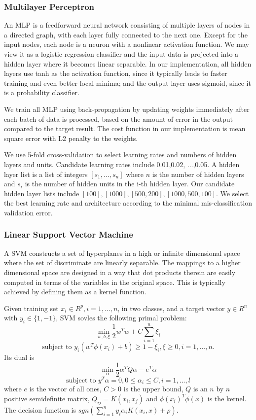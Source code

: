 \documentclass{acm_proc_article-sp}
\begin{document}
\subsubsection{Multilayer Perceptron}
An MLP is a feedforward neural network consisting of multiple layers of nodes in a directed graph, with each layer fully connected to the next one. Except for the input nodes, each node is a neuron with a nonlinear activation function. We may view it as a logistic regression classifier and the input data is projected into a hidden layer where it becomes linear separable. In our implementation, all hidden layers use tanh as the activation function, since it typically leads to faster training and even better local minima; and the output layer uses sigmoid, since it is a probability classifier.

We train all MLP using back-propagation by updating weights immediately after each batch of data is processed, based on the amount of error in the output compared to the target result. The cost function in our implementation is mean square error with L2 penalty to the weights.

We use 5-fold cross-validation to select learning rates and numbers of hidden layers and units. Candidate learning rates include 0.01,0.02, ...,0.05. A hidden layer list is a list of integers $[s_1,...,s_n]$ where $n$ is the number of hidden layers and $s_i$ is the number of hidden units in the i-th hidden layer. Our candidate hidden layer lists include $[100],[1000],[500,200],[1000,500,100]$. We select the best learning rate and architecture according to the minimal mis-classification validation error.

\subsubsection{Linear Support Vector Machine }
A SVM constructs a set of hyperplanes in a high or infinite dimensional space where the set of discriminate are linearly separable. The mappings to a higher dimensional space are designed in a way that dot products therein are easily computed in terms of the variables in the original space. This is typically achieved by defining them as a kernel function.

Given training set $x_i\in R^p,i=1,...,n$, in two classes, and a target vector $y\in R^n$ with $y_i\in \{1,-1\}$, SVM sovles the following primal problem:
\[
\min_{w,b,\xi} \frac12 w^T w + C \sum_{i=1}^n \xi_i
\]
\[
\mbox{subject to } y_i (w^T \phi(x_i)+b)\geq 1-\xi_i,
\xi\geq 0, i=1,...,n.
\]
Its dual is
\[
\min_{\alpha}\frac12 \alpha^T Q\alpha - e^T\alpha
\]
\[
\mbox{subject to } y^T\alpha = 0, 0\leq \alpha_i\leq C,i=1,...,l
\]
where $e$ is the vector of all ones, $C>0$ is the upper bound, $Q$ is an $n$ by $n$ positive semidefinite matrix, $Q_{ij}=K(x_i,x_j)$ and $\phi(x_i)^T\phi(x)$ is the kernel. The decision function is $sgn(\sum_{i=1}^n y_i\alpha_i K(x_i,x)+\rho)$.
\end{document}
